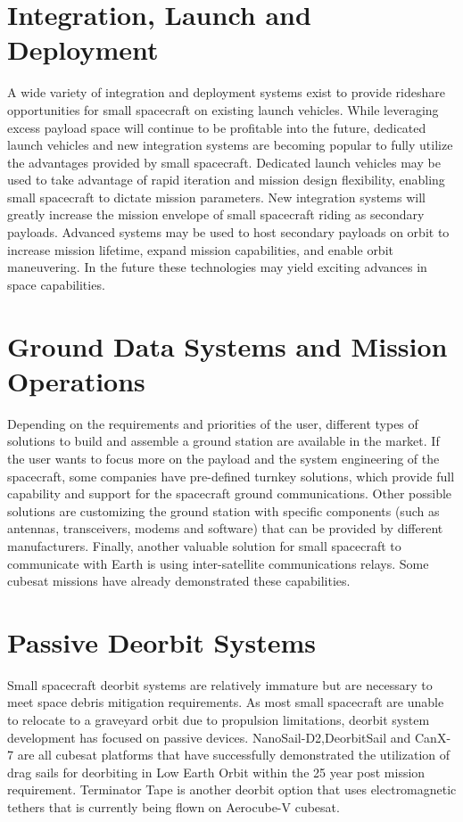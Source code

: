 \section{Integration, Launch and Deployment}
A wide variety of integration and deployment systems exist to provide rideshare opportunities for small spacecraft on existing launch vehicles. While leveraging excess payload space will continue to be profitable into the future, dedicated launch vehicles and new integration systems are becoming popular to fully utilize the advantages provided by small spacecraft. Dedicated launch vehicles may be used to take advantage of rapid iteration and mission design flexibility, enabling small spacecraft to dictate mission parameters. New integration systems will greatly increase the mission envelope of small spacecraft riding as secondary payloads. Advanced systems may be used to host secondary payloads on orbit to increase mission lifetime, expand mission capabilities, and enable orbit maneuvering. In the future these technologies may yield exciting advances in space capabilities.

\section{Ground Data Systems and Mission Operations}
Depending on the requirements and priorities of the user, different types of solutions to build and assemble a ground station are available in the market. If the user wants to focus more on the payload and the system engineering of the spacecraft, some companies have pre-defined turnkey solutions, which provide full capability and support for the spacecraft ground communications. Other possible solutions are customizing the ground station with specific components (such as antennas, transceivers, modems and software) that can be provided by different manufacturers.  Finally, another valuable solution for small spacecraft to communicate with Earth is using inter-satellite communications relays. Some cubesat missions have already demonstrated these capabilities. 

\section{Passive Deorbit Systems}
Small spacecraft deorbit systems are relatively immature but are necessary to meet space debris mitigation requirements. As most small spacecraft are unable to relocate to a graveyard orbit due to propulsion limitations, deorbit system development has focused on passive devices. NanoSail-D2,DeorbitSail and CanX-7 are all cubesat platforms that have successfully demonstrated the utilization of drag sails for deorbiting in Low Earth Orbit within the 25 year post mission requirement. Terminator Tape is another deorbit option that uses electromagnetic tethers that is currently being flown on Aerocube-V cubesat. 